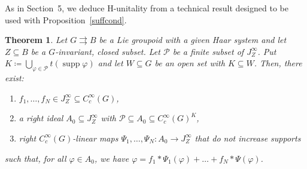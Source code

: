 \documentclass[12pt]{article}
\theoremstyle{plain}
\newtheorem{thm}{Theorem}[section]
\theoremstyle{definition}
\newcommand{\supp}{\operatorname{supp}}
\numberwithin{equation}{section}
\begin{document}
As in Section~5, we deduce H-unitality from a technical result designed to be used with Proposition~\ref{suffcond}.


\begin{thm}
Let $G \rightrightarrows B$ be a Lie groupoid with a given Haar system  and let $Z \subseteq B$ be a  $G$-invariant, closed subset. Let $\mathscr{P}$ be a finite subset of $J_Z^\infty$. Put $K \coloneqq \bigcup_{\varphi\in\mathscr{P}}t(\supp \varphi)$  and let $W\subseteq G$ be an open set with $K \subseteq W$. Then, there exist:
\begin{enumerate}
\item $f_1,\ldots,f_N \in J_Z^\infty \subseteq C_c^\infty(G)$,
\item a right ideal $A_0 \subseteq J_Z^\infty$ with $\mathscr{P} \subseteq A_0 \subseteq C_c^\infty(G)^K$,
\item right $C_c^\infty(G)$-linear maps $\Psi_1,\ldots,\Psi_N:A_0 \to J_Z^\infty$ that do not increase supports
\end{enumerate}
such that, for all $\varphi \in A_0$, we have $\varphi = f_1*\Psi_1(\varphi)+\ldots+f_N*\Psi(\varphi)$.
\end{thm}
\end{document}
